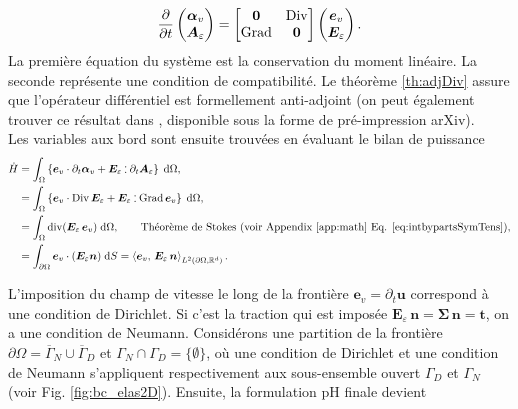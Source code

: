 \begin{equation*}
\diffp{}{t}
\begin{pmatrix}
\bm{\alpha}_v \\
\bm{A}_\varepsilon
\end{pmatrix} = 
\begin{bmatrix}
\bm{0} & \Div \\
\Grad & \bm{0} \\
\end{bmatrix}
\begin{pmatrix}
\bm{e}_v \\
\bm{E}_\varepsilon
\end{pmatrix}.
\end{equation*}
La première équation du système est la conservation du moment linéaire. La seconde représente une condition de compatibilité. Le théorème \ref{th:adjDiv} assure que l'opérateur différentiel est formellement anti-adjoint (on peut également trouver ce résultat dans \cite[Lemme 3.3] {pauly2020elasticity}, disponible sous la forme de pré-impression arXiv). \\

Les variables aux bord sont ensuite trouvées en évaluant le bilan de puissance
\begin{equation*}
\begin{aligned}
\dot{H} &= \int_{\Omega} \left\{ \bm{e}_v \cdot \partial_t \bm\alpha_v + \bm{E}_\varepsilon \cddot \partial_t \bm{A}_\varepsilon \right\} \d\Omega, \\
&= \int_{\Omega} \left\{\bm{e}_v \cdot \Div \bm{E}_\varepsilon + \bm{E}_\varepsilon \cddot \Grad \bm{e}_v \right\}\d\Omega,\\
&= \int_{\Omega} \div(\bm{E}_\varepsilon \, \bm{e}_v) \d\Omega, \qquad \text{Théorème de Stokes (voir  Appendix \ref{app:math} Eq. \eqref{eq:intbypartsSymTens}}), \\
&= \int_{\partial \Omega} \bm{e}_v \cdot (\bm{E}_\varepsilon\bm{n}) \d{S} = \inner[L^2(\partial\Omega, \bbR^d)]{\bm{e}_v}{\bm{E}_\varepsilon \, \bm{n}}.
\end{aligned}
\end{equation*}

L'imposition du champ de vitesse le long de la frontière $ \bm{e}_v = \partial_t \bm{u} $ correspond à une condition de Dirichlet. Si c'est la traction qui est imposée $ \bm{E}_\varepsilon \, \bm{n} = \bm{\Sigma} \, \bm{n} = \bm{t}$, on a une condition de Neumann. Considérons une partition de la frontière $\partial \Omega = \overline{\Gamma}_N \cup \overline{\Gamma}_D $ et $\Gamma_N \cap \Gamma_D = \{\emptyset\} $, où une condition de Dirichlet et une condition de Neumann s'appliquent respectivement aux sous-ensemble ouvert $\Gamma_D $ et $\Gamma_N $ (voir Fig. \ref{fig:bc_elas2D}). Ensuite, la formulation pH finale devient

